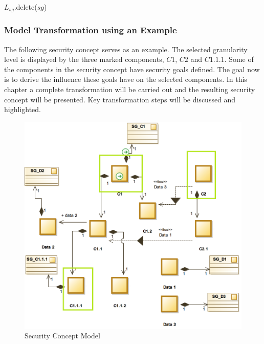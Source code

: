 \begin{algorithm}
\begin{algorithmic}

\State $L_{sg}$.delete($sg$)
\EndIf
\EndFor
\EndFor
\EndFunction
{}

\end{algorithmic}
\end{algorithm}

\subsubsection{Model Transformation using an Example}
\label{subsubsec:transformation_example}
The following security concept serves as an example. The selected granularity level is displayed by the three marked components, $C1$, $C2$ and $C1.1.1$. Some of the components in the security concept have security goals defined. The goal now is to derive the influence these goals have on the selected components. In this chapter a complete transformation will be carried out and the resulting security concept will be presented. Key transformation steps will be discussed and highlighted.

\begin{figure}[H]
        \includegraphics[width=1\linewidth]{pictures/sg_transformation}
    \caption{Security Concept Model}
\end{figure}

